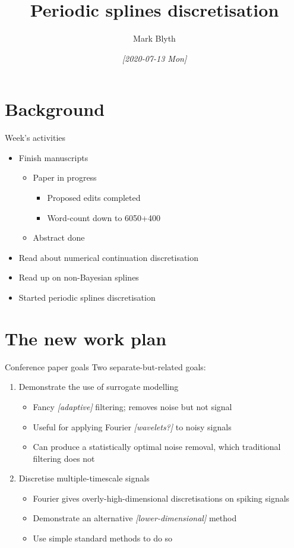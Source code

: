 \documentclass[presentation]{beamer}
\author{Mark Blyth}
\date{\textit{[2020-07-13 Mon]}}
\title{Periodic splines discretisation}
\begin{document}
\maketitle

\section{Background}
\label{sec:orgb4f90c2}
\begin{frame}[label={sec:orgec15545}]{Week's activities}
\begin{itemize}
\item Finish manuscripts
\begin{itemize}
\item Paper in progress
\begin{itemize}
\item Proposed edits completed
\item Word-count down to 6050+400
\end{itemize}
\item Abstract done
\end{itemize}
\item Read about numerical continuation discretisation
\item Read up on non-Bayesian splines
\item Started periodic splines discretisation
\end{itemize}
\end{frame}

\section{The new work plan}
\label{sec:org003b327}
\begin{frame}[label={sec:org16542f0}]{Conference paper goals}
Two separate-but-related goals:
\vfill
\begin{enumerate}[<+->]
\item Demonstrate the use of surrogate modelling
\begin{itemize}
\item Fancy \emph{[adaptive]} filtering; removes noise but not signal
\item Useful for applying Fourier \emph{[wavelets?]} to noisy signals
\item Can produce a statistically optimal noise removal, which traditional filtering does not
\end{itemize}
\item Discretise multiple-timescale signals
\begin{itemize}
\item Fourier gives overly-high-dimensional discretisations on spiking signals
\item Demonstrate an alternative \emph{[lower-dimensional]} method
\item Use simple standard methods to do so
\end{itemize}
\end{enumerate}
\end{frame}
\end{document}
